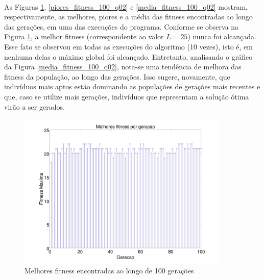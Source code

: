 \documentclass{report}
\begin{document}
	\paragraph{} As Figuras \ref{melhores_fitness_100_q02}, \ref{piores_fitness_100_q02} e \ref{media_fitness_100_q02} mostram, respectivamente, as melhores, piores e a média das fitness encontradas ao longo das gerações, em uma das execuções do programa. Conforme se observa na Figura \ref{melhores_fitness_100_q02}, a melhor fitness (correspondente ao valor $L = 25$) nunca foi alcançada. Esse fato se observou em todas as execuções do algoritmo (10 vezes), isto é, em nenhuma delas o máximo global foi alcançado. Entretanto, analisando o gráfico da Figura \ref{media_fitness_100_q02}, nota-se uma tendência de melhora das fitness da população, ao longo das gerações. Isso sugere, novamente, que indivíduos mais aptos estão dominando as populações de gerações mais recentes e que, caso se utilize mais gerações, indivíduos que representam a solução ótima virão a ser gerados.\\
	
	\begin{figure}[H]
		\centering
		\includegraphics[width = 0.9\textwidth]{Q02_melhores_fitness_100.jpg}
		\caption{Melhores fitness encontradas ao longo de 100 gerações}
		\label{melhores_fitness_100_q02}
	\end{figure}
	
\end{document}
